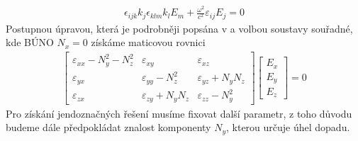 \begin{eqnarray}
\epsilon_{ijk}k_j\epsilon_{klm}k_lE_m+\frac{\omega^2}{c^2}\varepsilon_{ij}E_j =0
\end{eqnarray}
Postupnou úpravou, která je podrobněji popsána v \cite{Nyvlt} a volbou soustavy souřadné, kde BÚNO $N_x=0$ získáme maticovou rovnici
\begin{eqnarray}
\begin{bmatrix}
\varepsilon_{xx}-N_y^2-N_z^2& \varepsilon_{xy}& \varepsilon_{xz} \\
\varepsilon_{yx}&   \varepsilon_{yy}-N_z^2& \varepsilon_{yz}+N_yN_z\\
\varepsilon_{zx}&   \varepsilon_{zy}+N_yN_z& \varepsilon_{zz}-N_y^2
\end{bmatrix}
\begin{bmatrix}
E_x\\ E_y\\ E_z
\end{bmatrix} = 0
\label{Matic1}
\end{eqnarray}
Pro získání jendoznačných řešení musíme fixovat další parametr, z toho důvodu budeme dále předpokládat znalost komponenty $N_y$, kterou určuje úhel dopadu. %

